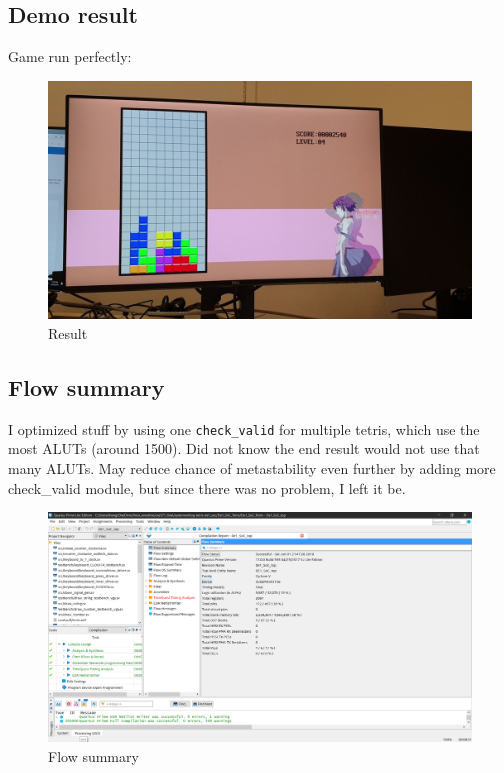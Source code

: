 \documentclass[scale = 0.9]{article}
\newcommand{\code}[1]{\colorbox{light-gray}{\texttt{#1}}} %
\begin{document}
\subsection{Demo result}
Game run perfectly:
\begin{figure}[H]
  \begin{center}
    \includegraphics[width=\textwidth]{result.png}
    \caption{Result}\label{result}
  \end{center}
\end{figure}

\subsection{Flow summary}
I optimized stuff by using one \code{check\_valid} for multiple tetris, which use the most
ALUTs (around 1500). Did not know the end result would not use that many ALUTs. May reduce
chance of metastability even further by adding more check\_valid module, but since there was
no problem, I left it be.
\begin{figure}[H]
  \begin{center}
    \includegraphics[width=\textwidth]{flow_summary.png}
    \caption{Flow summary}\label{flow_summary}
  \end{center}
\end{figure}
\end{document}
